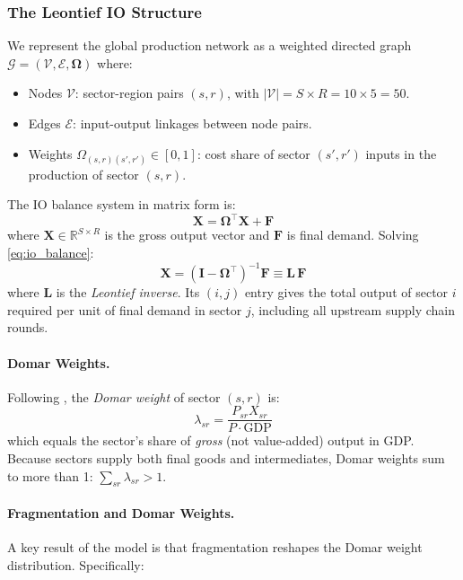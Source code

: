 \subsubsection{The Leontief IO Structure}

We represent the global production network as a weighted directed graph
$\mathcal{G} = (\mathcal{V}, \mathcal{E}, \boldsymbol{\Omega})$ where:
\begin{itemize}
  \item Nodes $\mathcal{V}$: sector-region pairs $(s,r)$, with
    $|\mathcal{V}| = S \times R = 10 \times 5 = 50$.
  \item Edges $\mathcal{E}$: input-output linkages between node pairs.
  \item Weights $\Omega_{(s,r)(s',r')} \in [0,1]$: cost share of sector
    $(s',r')$ inputs in the production of sector $(s,r)$.
\end{itemize}

The IO balance system in matrix form is:
\begin{equation}
  \mathbf{X} = \boldsymbol{\Omega}^\top \mathbf{X} + \mathbf{F}
  \label{eq:io_balance}
\end{equation}
where $\mathbf{X} \in \mathbb{R}^{S \times R}$ is the gross output vector and
$\mathbf{F}$ is final demand. Solving \eqref{eq:io_balance}:
\begin{equation}
  \mathbf{X} = (\mathbf{I} - \boldsymbol{\Omega}^\top)^{-1}\mathbf{F}
  \equiv \mathbf{L}\,\mathbf{F}
  \label{eq:leontief}
\end{equation}
where $\mathbf{L}$ is the \emph{Leontief inverse}. Its $(i,j)$ entry gives
the total output of sector $i$ required per unit of final demand in sector $j$,
including all upstream supply chain rounds.

\paragraph{Domar Weights.}
Following \citet{baqaee2019}, the \emph{Domar weight} of sector $(s,r)$ is:
\begin{equation}
  \lambda_{sr} = \frac{P_{sr} X_{sr}}{P \cdot \mathrm{GDP}}
  \label{eq:domar}
\end{equation}
which equals the sector's share of \emph{gross} (not value-added) output in
GDP. Because sectors supply both final goods and intermediates, Domar weights
sum to more than 1: $\sum_{sr} \lambda_{sr} > 1$.

\paragraph{Fragmentation and Domar Weights.}
A key result of the model is that fragmentation reshapes the Domar weight
distribution. Specifically:

